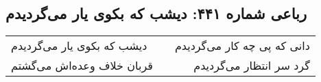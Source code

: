 \begin{center}
\section*{رباعی شماره ۴۴۱: دیشب که بکوی یار می‌گردیدم}
\label{sec:sh441}
\begin{longtable}{l p{0.5cm} r}
دیشب که بکوی یار می‌گردیدم
&&
دانی که پی چه کار می‌گردیدم
\\
قربان خلاف وعده‌اش می‌گشتم
&&
گرد سر انتظار می‌گردیدم
\\
\end{longtable}
\end{center}
